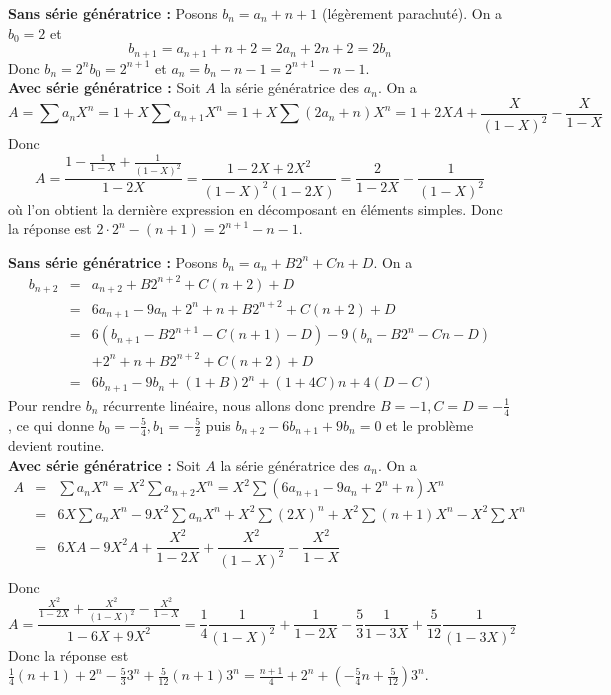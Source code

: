 \begin{sol}
\textbf{Sans série génératrice :} Posons $b_n = a_n + n + 1$ (légèrement parachuté). On a $b_0 = 2$ et
$$b_{n + 1} = a_{n + 1} + n + 2 = 2a_n + 2n + 2 = 2b_n$$
Donc $b_n = 2^nb_0 = 2^{n + 1}$ et $a_n = b_n - n - 1 = 2^{n + 1} - n - 1$. \\
\textbf{Avec série génératrice :} Soit $A$ la série génératrice des $a_n$. On a
$$A = \sum a_nX^n = 1 + X\sum a_{n + 1}X^n = 1 + X\sum (2a_n + n)X^n = 1 + 2XA + \frac X{(1 - X)^2} - \frac X{1 - X}$$
Donc
$$A = \frac{1 - \frac 1{1 - X} + \frac 1{(1 - X)^2}}{1 - 2X} = \frac{1 - 2X + 2X^2}{(1 - X)^2(1 - 2X)} = \frac 2{1 - 2X} - \frac 1{(1 - X)^2}$$
où l'on obtient la dernière expression en décomposant en éléments simples. Donc la réponse est $2\cdot 2^n - (n + 1) = 2^{n + 1} - n - 1$.
\end{sol}


\begin{sol}
\textbf{Sans série génératrice :} Posons $b_n = a_n + B2^n + Cn + D$. On a
$$\begin{array}{rcl}
b_{n + 2}
& = & a_{n + 2} + B2^{n + 2} + C(n + 2) + D  \\
& = & 6a_{n + 1} - 9a_n + 2^n + n + B2^{n + 2} + C(n + 2) + D \\
& = & 6(b_{n + 1} - B2^{n + 1} - C(n + 1) - D) - 9(b_n - B2^n - Cn - D) \\
&   & + 2^n + n + B2^{n + 2} + C(n + 2) + D \\
& = & 6b_{n + 1} - 9b_n + (1 + B)2^n + (1 + 4C)n + 4(D - C)
\end{array}$$
Pour rendre $b_n$ récurrente linéaire, nous allons donc prendre $B = -1, C = D = -\frac 1 4$, ce qui donne $b_0 = -\frac 5 4, b_1 = -\frac 52$ puis $b_{n + 2} - 6b_{n + 1} + 9b_n = 0$ et le problème devient routine. \\
\textbf{Avec série génératrice :} Soit $A$ la série génératrice des $a_n$. On a
$$\begin{array}{rcl}
A
& = & \displaystyle \sum a_nX^n = X^2\sum a_{n + 2}X^n = X^2\sum (6a_{n + 1} - 9a_n + 2^n + n)X^n \\
& = & \displaystyle 6X\sum a_nX^n - 9X^2\sum a_nX^n + X^2\sum (2X)^n + X^2\sum (n + 1)X^n - X^2\sum X^n \\
& = & \displaystyle 6XA - 9X^2A + \dfrac{X^2}{1 - 2X} + \dfrac{X^2}{(1 - X)^2}- \dfrac{X^2}{1 - X} \\
\end{array}$$
Donc
$$A = \frac{\frac{X^2}{1 - 2X} + \frac{X^2}{(1 - X)^2}- \frac{X^2}{1 - X}}{1 - 6X + 9X^2} = \frac 1 4\frac 1{(1 - X)^2} + \frac 1{1 - 2X} - \frac 5 3\frac 1{1 - 3X} + \frac 5{12}\frac 1{(1 - 3X)^2}$$
Donc la réponse est $\frac 1 4 (n + 1) + 2^n - \frac 5 3 3^n + \frac 5{12}(n + 1)3^n = \frac{n + 1}4 + 2^n + \left(-\frac 5 4 n + \frac 5{12}\right)3^n$.
\end{sol}


